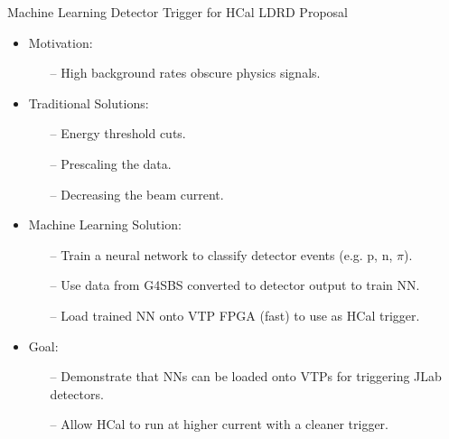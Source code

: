 \documentclass[10pt]{beamer}
\begin{document}
\begin{frame}{Machine Learning Detector Trigger for HCal LDRD Proposal}

	\begin{itemize}
		\item Motivation:
			\begin{itemize}
				\item[--] High background rates obscure physics signals.
			\end{itemize}
		\item Traditional Solutions:
			\begin{itemize}
				\item[--] Energy threshold cuts.
				\item[--] Prescaling the data.
				\item[--] Decreasing the beam current.
			\end{itemize}
		\item Machine Learning Solution:
			\begin{itemize}
				\item[--] Train a neural network to classify detector events (e.g. p, n, $\pi$).
				\item[--] Use data from G4SBS converted to detector output to train NN.
				\item[--] Load trained NN onto VTP FPGA (fast) to use as HCal trigger.
			\end{itemize}
		\item Goal:
			\begin{itemize}
				\item[--] Demonstrate that NNs can be loaded onto VTPs for triggering JLab detectors.
				\item[--] Allow HCal to run at higher current with a cleaner trigger.
			\end{itemize}
	\end{itemize}

\end{frame}
\end{document}
